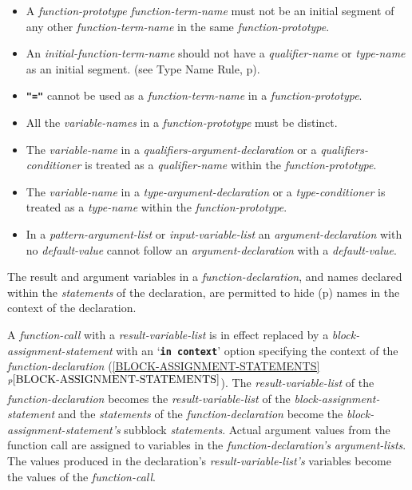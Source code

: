 \documentclass[12pt]{article}
\newcommand{\TT}[1]{{\tt \bfseries #1}}
\newcommand{\itemref}[1]{\ref{#1}$^{p\pageref{#1}}$}
\newcommand{\pagref}[1]{p\pageref{#1}}
\newcommand{\EOL}{\penalty \exhyphenpenalty}
\newenvironment{indpar}[1][0.3in]%
	{\begin{list}{}%
		     {\setlength{\itemsep}{0in}%
		      \setlength{\topsep}{0in}%
		      \setlength{\parsep}{1ex}%
		      \setlength{\labelwidth}{#1}%
		      \setlength{\leftmargin}{#1}%
		      \addtolength{\leftmargin}{\labelsep}}%
	 \item}%
	{\end{list}}
\begin{document}
\begin{indpar}
\begin{itemize}
\item
A {\em function-prototype} {\em function-term-name} must not be
an initial segment of any other {\em function-term-name}
in the same {\em function-prototype}.
\item
An {\em initial-function-term-name}
should not have a {\em qualifier-name} or {\em type-name} as an initial segment.
(see Type Name Rule, \pagref{NAME-RULES}).
\item
\TT{"="} cannot be used as a {\em function-term-name}
in a {\em function-prototype}.
\item
All the {\em variable-names} in a {\em function-prototype} must
be distinct.
\item
The {\em variable-name} in a {\em qualifiers-argument-declaration}
or a {\em qualifiers-conditioner} is treated as a {\em qualifier-name}
within the {\em function-prototype}.
\item
The {\em variable-name} in a {\em type-argument-declaration}
or a {\em type-conditioner} is treated as a {\em type-name}
within the {\em function-prototype}.
\item
In a {\em pattern-argument-list} or {\em input-variable-list}
an {\em argument-declaration} with no {\em de\-fault-value} cannot
follow an {\em argument-declaration} with a {\em default-value}.

\end{itemize}
\end{indpar}

The result and argument variables in a
{\em function-declaration},
and names declared within the {\em statements} of the declaration,
are permitted to hide (\pagref{HIDE})
names in the context of the declaration.

A {\em function-call} with a {\em result-variable-list}
is in effect replaced by a {\em block-assignment-statement}
with an `\TT{in context}' option specifying the context of the
{\em function-declaration}
(\itemref{BLOCK-ASSIGNMENT-STATEMENTS}).
The {\em result-variable-list} of the {\em function-declaration} becomes the
{\em result-variable-list} of the {\em block-as\-sign\-ment-statement} and the
{\em statements} of the {\em function-declaration} become the 
{\em block-\EOL assign\-ment-\EOL state\-ment's} subblock {\em statements}.
Actual argument values from the function call are assigned to variables in
the {\em function-declaration's} {\em argument-lists}.  The values produced in
the declaration's {\em result-variable-list's} variables
become the values of the {\em function-call}.
\end{document}
